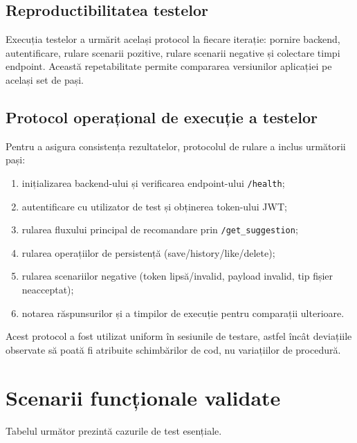\subsection{Reproductibilitatea testelor}
Execuția testelor a urmărit același protocol la fiecare iterație: pornire backend, autentificare, rulare scenarii pozitive, rulare scenarii negative și colectare timpi endpoint. Această repetabilitate permite compararea versiunilor aplicației pe același set de pași.

\subsection{Protocol operațional de execuție a testelor}
Pentru a asigura consistența rezultatelor, protocolul de rulare a inclus următorii pași:
\begin{enumerate}
    \item inițializarea backend-ului și verificarea endpoint-ului \texttt{/health};
    \item autentificare cu utilizator de test și obținerea token-ului JWT;
    \item rularea fluxului principal de recomandare prin \texttt{/get\_suggestion};
    \item rularea operațiilor de persistență (save/history/like/delete);
    \item rularea scenariilor negative (token lipsă/invalid, payload invalid, tip fișier neacceptat);
    \item notarea răspunsurilor și a timpilor de execuție pentru comparații ulterioare.
\end{enumerate}

Acest protocol a fost utilizat uniform în sesiunile de testare, astfel încât deviațiile observate să poată fi atribuite schimbărilor de cod, nu variațiilor de procedură.

\section{Scenarii funcționale validate}
Tabelul următor prezintă cazurile de test esențiale.

